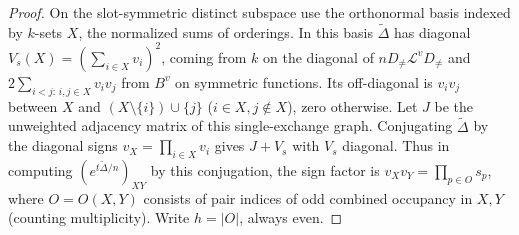 \begin{proof}
On the slot-symmetric distinct subspace use the orthonormal basis indexed by \(k\)-sets \(X\), the normalized sums of orderings. In this basis \(\widetilde\Delta\) has diagonal \(V_s(X)=(\sum_{i\in X} v_i)^2\), coming from \(k\) on the diagonal of \(nD_{\ne}\mathcal L^vD_{\ne}\) and \(2\sum_{i<j:\,i,j\in X}v_i v_j\) from \(B^v\) on symmetric functions. Its off-diagonal is \(v_i v_j\) between \(X\) and \((X\setminus\{i\})\cup\{j\}\) (\(i\in X,j\notin X\)), zero otherwise. Let \(J\) be the unweighted adjacency matrix of this single-exchange graph. Conjugating \(\widetilde\Delta\) by the diagonal signs \(v_X=\prod_{i\in X} v_i\) gives \(J+V_s\) with \(V_s\) diagonal. Thus in computing \((e^{t\widetilde\Delta/n})_{XY}\) by this conjugation, the sign factor is \(v_Xv_Y=\prod_{p\in O}s_p\), where \(O=O(X,Y)\) consists of pair indices of odd combined occupancy in \(X,Y\) (counting multiplicity). Write \(h=|O|\), always even.


\end{proof}

